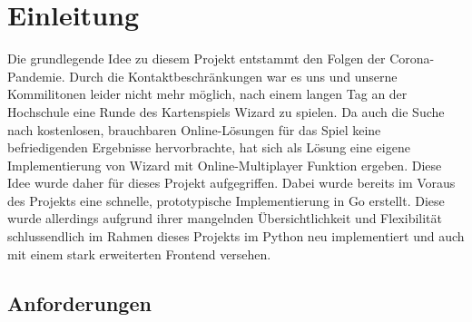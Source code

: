 \chapter{Einleitung}

Die grundlegende Idee zu diesem Projekt entstammt den Folgen der Corona-Pandemie. Durch die Kontaktbeschränkungen war es uns und unserne Kommilitonen leider nicht mehr möglich, nach einem langen Tag an der Hochschule eine Runde des Kartenspiels Wizard zu spielen. Da auch die Suche nach kostenlosen, brauchbaren Online-Lösungen für das Spiel keine befriedigenden Ergebnisse hervorbrachte, hat sich als Lösung eine eigene Implementierung von Wizard mit Online-Multiplayer Funktion ergeben. Diese Idee wurde daher für dieses Projekt aufgegriffen. Dabei wurde bereits im Voraus des Projekts eine schnelle, prototypische Implementierung in Go erstellt. Diese wurde allerdings aufgrund ihrer mangelnden Übersichtlichkeit und Flexibilität schlussendlich im Rahmen dieses Projekts im Python neu implementiert und auch mit einem stark erweiterten Frontend versehen.

\section{Anforderungen}


